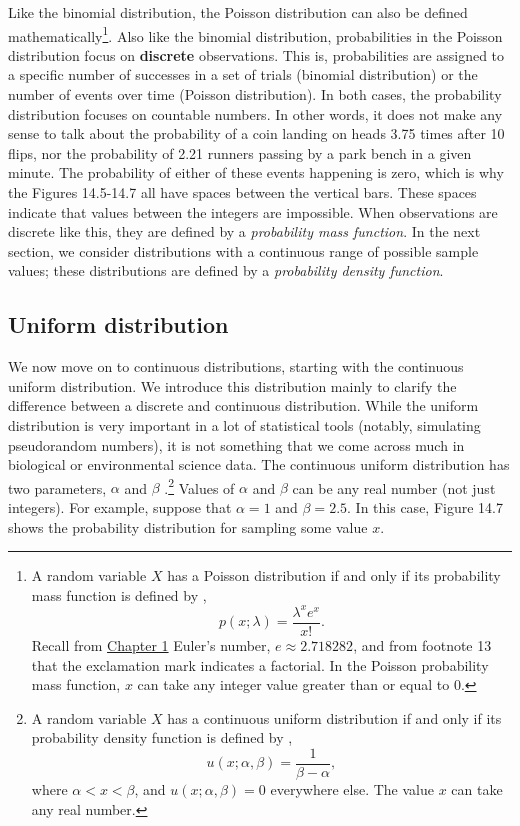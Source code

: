 \documentclass[
]{scrbook}
\begin{document}
Like the binomial distribution, the Poisson distribution can also be defined mathematically\footnote{A random variable \(X\) has a Poisson distribution if and only if its probability mass function is defined by \citep{Miller2004}, \[p \left(x; \lambda \right) = \frac{\lambda^{x}e^{x}}{x!}.\] Recall from \protect\hyperlink{Chapter_1}{Chapter 1} Euler's number, \(e \approx 2.718282\), and from footnote 13 that the exclamation mark indicates a factorial. In the Poisson probability mass function, \(x\) can take any integer value greater than or equal to 0.}.
Also like the binomial distribution, probabilities in the Poisson distribution focus on \textbf{discrete} observations.
This is, probabilities are assigned to a specific number of successes in a set of trials (binomial distribution) or the number of events over time (Poisson distribution).
In both cases, the probability distribution focuses on countable numbers.
In other words, it does not make any sense to talk about the probability of a coin landing on heads 3.75 times after 10 flips, nor the probability of 2.21 runners passing by a park bench in a given minute.
The probability of either of these events happening is zero, which is why the Figures 14.5-14.7 all have spaces between the vertical bars.
These spaces indicate that values between the integers are impossible.
When observations are discrete like this, they are defined by a \emph{probability mass function}.
In the next section, we consider distributions with a continuous range of possible sample values; these distributions are defined by a \emph{probability density function}.

\hypertarget{uniform-distribution}{%
\subsection{Uniform distribution}\label{uniform-distribution}}

We now move on to continuous distributions, starting with the continuous uniform distribution.
We introduce this distribution mainly to clarify the difference between a discrete and continuous distribution.
While the uniform distribution is very important in a lot of statistical tools (notably, simulating pseudorandom numbers), it is not something that we come across much in biological or environmental science data.
The continuous uniform distribution has two parameters, \(\alpha\) and \(\beta\) \citep{Miller2004}.\footnote{A random variable \(X\) has a continuous uniform distribution if and only if its probability density function is defined by \citep{Miller2004}, \[u\left(x; \alpha, \beta\right) = \frac{1}{\beta - \alpha},\] where \(\alpha < x < \beta\), and \(u\left(x; \alpha, \beta\right) = 0\) everywhere else. The value \(x\) can take any real number.}
Values of \(\alpha\) and \(\beta\) can be any real number (not just integers).
For example, suppose that \(\alpha = 1\) and \(\beta = 2.5\).
In this case, Figure 14.7 shows the probability distribution for sampling some value \(x\).
\end{document}
